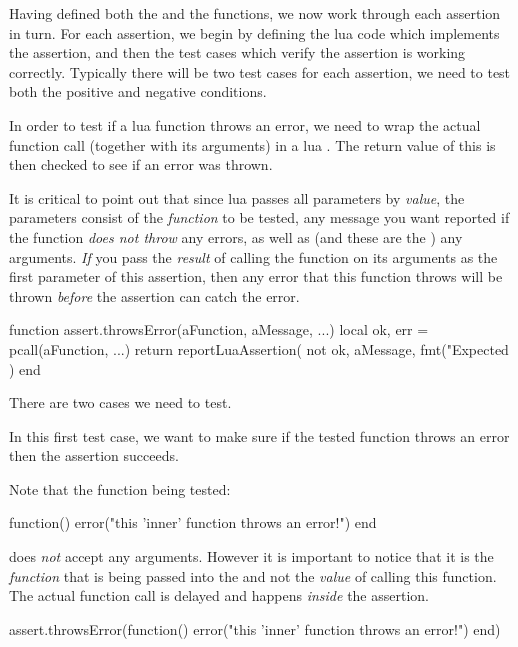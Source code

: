 Having defined both the  and the  
functions, we now work through each assertion in turn. For each assertion, 
we begin by defining the lua code which implements the assertion, and then 
the test cases which verify the assertion is working correctly. Typically 
there will be two test cases for each assertion, we need to test both the 
positive and negative conditions. 


In order to test if a lua function throws an error, we need to wrap the 
actual function call (together with its arguments) in a lua . 
The return value of this  is then checked to see if an error 
was thrown. 

It is critical to point out that since lua passes all parameters by 
\emph{value}, the  parameters consist of the 
\emph{function} to be tested, any message you want reported if the 
function \emph{does not throw} any errors, as well as (and these are the 
) any arguments. \emph{If} you pass the \emph{result} of 
calling the function on its arguments as the first parameter of this 
assertion, then any error that this function throws will be thrown 
\emph{before} the assertion can catch the error. 

\startLuaCode
function assert.throwsError(aFunction, aMessage, ...)
  local ok, err = pcall(aFunction, ...)
  return reportLuaAssertion(
    not ok,
    aMessage,
    fmt("Expected %
  )
end
\stopLuaCode

There are two cases we need to test.


In this first test case, we want to make sure if the tested function 
throws an error then the assertion succeeds.

Note that the function being tested: 

\starttyping[option=lua]
function()
  error("this 'inner' function throws an error!")
end
\stoptyping

\noindent does \emph{not} accept any arguments. However it is important to 
notice that it is the \emph{function} that is being passed into the 
 and not the \emph{value} of calling this 
function. The actual function call is delayed and happens \emph{inside} 
the assertion. 

\startLuaTest
  assert.throwsError(function()
    error("this 'inner' function throws an error!")
  end)
\stopLuaTest
\stopTestCase

